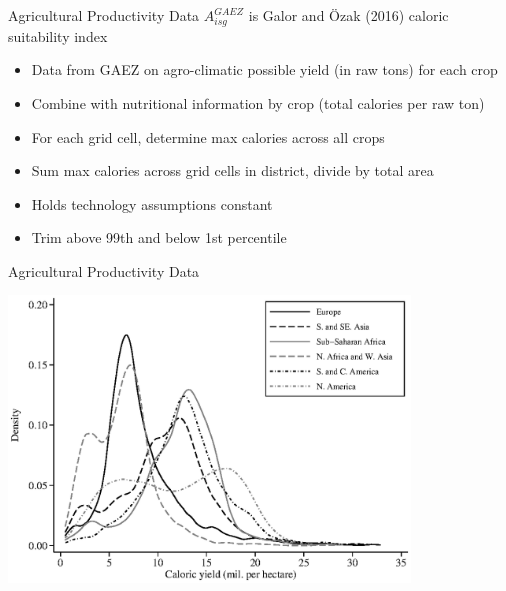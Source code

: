 \documentclass[10pt, xcolor=dvipsnames]{beamer}
\begin{document}
\begin{frame}{Agricultural Productivity Data}\label{data}
$A^{GAEZ}_{isg}$ is Galor and {\"O}zak (2016) caloric suitability index
\begin{itemize}
  \item Data from GAEZ on agro-climatic possible yield (in raw tons) for each crop
  \item Combine with nutritional information by crop (total calories per raw ton)
  \item For each grid cell, determine max calories across all crops
  \item Sum max calories across grid cells in district, divide by total area
  \item Holds technology assumptions constant
  \item Trim above 99th and below 1st percentile
\end{itemize}
\hfill \hyperlink{stats}{}

\hfill \hyperlink{crops}{}
\end{frame}

\begin{frame}{Agricultural Productivity Data}
\begin{center}
\includegraphics[width=0.8\textwidth]{fig_dens_csi.eps}
\end{center}
\end{frame}
\end{document}
